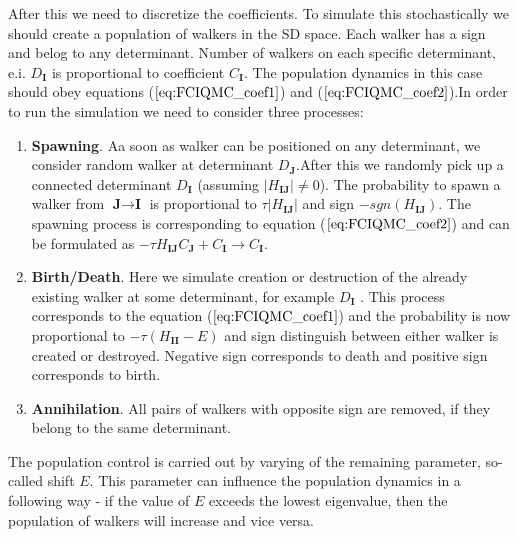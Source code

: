\documentclass[twoside,english]{uiofysmaster}
\theoremstyle{definition}
\begin{document}
After this we need to discretize the coefficients. To simulate this stochastically we should create a population of walkers in the SD space. Each walker has a sign and belog to any determinant. Number of walkers on each specific determinant, e.i. $D_{\textbf{I}}$ is proportional to coefficient $C_{\textbf{I}}$. The population dynamics in this case should obey equations ($\ref{eq:FCIQMC_coef1}$) and ($\ref{eq:FCIQMC_coef2}$).In order to run the simulation we need to consider three processes:\\
\begin{enumerate}
	\item \textbf{Spawning}. Aa soon as walker can be positioned on any determinant, we consider random walker at determinant $D_{\textbf{J}}$.After this we randomly pick up a connected determinant  $D_{\textbf{I}}$ (assuming $|H_{\textbf{IJ}}|\neq 0$). The probability to spawn a walker from $\textbf{J} \rightarrow \textbf{I} $ is proportional to $\tau |H_{\textbf{IJ}}| $ and sign $- sgn(H_{\textbf{IJ}})$. The spawning process is corresponding to equation ($\ref{eq:FCIQMC_coef2}$) and can be formulated as $ - \tau H_{\textbf{IJ}} C_{\textbf{J}} + C_{\textbf{I}} \rightarrow  C_{\textbf{I}} $.
	\item \textbf{Birth/Death}. Here we simulate creation or destruction of the already existing walker at some determinant, for example $D_{\textbf{I}}$ . This process corresponds to the  equation ($\ref{eq:FCIQMC_coef1}$) and the probability is now proportional to $- \tau (H_{\textbf{II}} - E) $ and sign distinguish between either walker is created or destroyed. Negative sign corresponds to death and positive sign corresponds to birth.
	\item \textbf{Annihilation}. All pairs of walkers with opposite sign are removed, if they belong to the same determinant.
\end{enumerate}
The population control is carried out by varying of the remaining parameter, so-called shift $E$. This parameter can influence the population dynamics in a following way - if the value of $E$ exceeds the lowest eigenvalue, then the population of walkers will increase and vice versa. 
\end{document}
